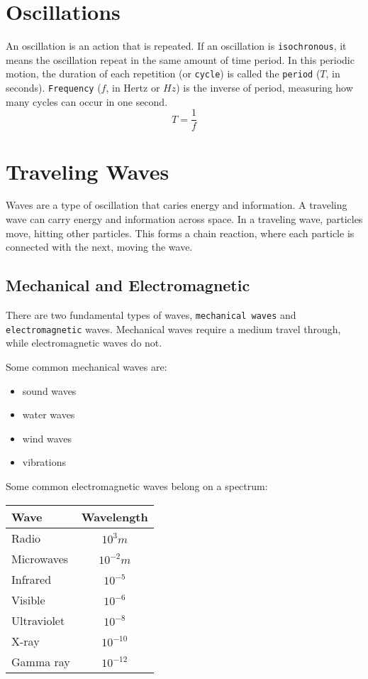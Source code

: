 \documentclass[../notes.tex]{subfiles}
\begin{document}
\section{Oscillations}
An oscillation is an action that is repeated.
If an oscillation is \texttt{isochronous}, it means the oscillation repeat in the same amount of time period.
In this periodic motion, the duration of each repetition (or \texttt{cycle}) is called the \texttt{period} ($T$, in seconds).
\texttt{Frequency} ($f$, in Hertz or $Hz$) is the inverse of period, measuring how many cycles can occur in one second.
\begin{equation}
    T = \frac{1}{f}
\end{equation}

\section{Traveling Waves}
Waves are a type of oscillation that caries energy and information.
A traveling wave can carry energy and information across space. 
In a traveling wave, particles move, hitting other particles. 
This forms a chain reaction, where each particle is connected with the next, moving the wave.

\subsection{Mechanical and Electromagnetic}
There are two fundamental types of waves, \texttt{mechanical waves} and \texttt{electromagnetic} waves.
Mechanical waves require a medium travel through, while electromagnetic waves do not.

Some common mechanical waves are: 
\begin{itemize}
    \item sound waves
    \item water waves
    \item wind waves
    \item vibrations
\end{itemize}

Some common electromagnetic waves belong on a spectrum:
\begin{tabular}{ l | c }
    Wave & Wavelength \\
    \hline
    Radio & $10^3 m$ \\
    Microwaves & $10^{-2} m$ \\ 
    Infrared & $10^{-5}$ \\
    Visible & $10^{-6}$ \\
    Ultraviolet & $10^{-8}$ \\
    X-ray & $10^{-10}$ \\
    Gamma ray & $10^{-12}$
\end{tabular}
\end{document}
